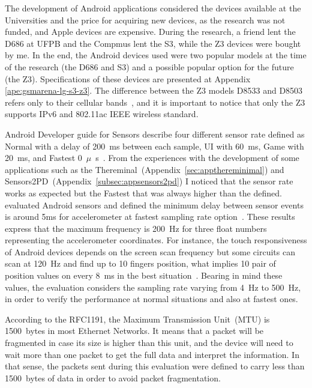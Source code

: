 The development of Android applications considered the devices available at the Universities and the price for acquiring new devices, as the research was not funded, and Apple devices are expensive.
During the research, a friend lent the D686 at UFPB and the Compmus lent the S3, while the Z3 devices were bought by me.
In the end, the Android devices used were two popular models at the time of the research (the D686 and S3) and a possible popular option for the future (the Z3).
Specifications of these devices are presented at Appendix \ref{ape:gsmarena-lg-s3-z3}.
The difference between the Z3 models D8533 and D8503 refers only to their cellular bands~\cite{Sony2017xperiaz3}, and it is important to notice that only the Z3 supports IPv6 and 802.11ac IEEE wireless standard.

Android Developer guide for Sensors describe four different sensor rate defined as Normal with a delay of 200~ms between each sample, UI with 60~ms, Game with 20~ms, and Fastest 0~$\mu$~s~\cite{Android2017sensorsoverview}.
From the experiences with the development of some applications such as the Thereminal~(Appendix~\ref{sec:appthereminimal}) and Sensors2PD~(Appendix~\ref{subsec:appsensors2pd}) I noticed that the sensor rate works as expected but the Fastest that was always higher than the defined.
 evaluated Android sensors and defined the minimum delay between sensor events is around 5ms for accelerometer at fastest sampling rate option~\cite{Ma2013experimental}.
These results express that the maximum frequency is 200~Hz for three float numbers representing the accelerometer coordinates.
For instance, the touch responsiveness of Android devices depends on the screen scan frequency but some circuits can scan at 120~Hz and find up to 10 fingers position, what implies 10 pair of position values on every 8~ms in the best situation~\cite{Padre2017touchresponsiveness}.
Bearing in mind these values, the evaluation considers the sampling rate varying from 4~Hz to 500~Hz, in order to verify the performance at normal situations and also at fastest ones.  

According to the RFC1191, the Maximum Transmission Unit~(MTU) is 1500~bytes in most Ethernet Networks.
It means that a packet will be fragmented in case its size is higher than this unit, and the device will need to wait more than one packet to get the full data and interpret the information.
In that sense, the packets sent during this evaluation were defined to carry less than 1500~bytes of data in order to avoid packet fragmentation.

